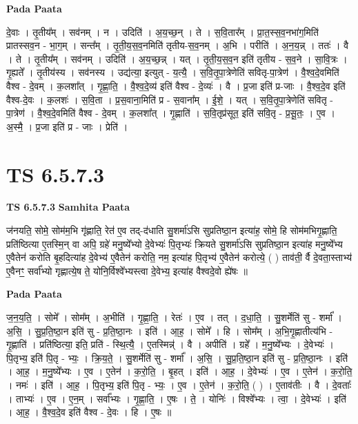 \documentclass[17pt]{extarticle}
\begin{document}
\textbf{Pada Paata} \newline

दे॒वाः । तृ॒तीय᳚म् । सव॑नम् । न । उदिति॑ । अ॒य॒च्छ॒न् । ते । स॒वि॒तार᳚म् । प्रा॒त॒स्स॒व॒नभा॑ग॒मिति॑ प्रातस्सव॒न - भा॒ग॒म् । सन्त᳚म् । तृ॒ती॒य॒स॒व॒नमिति॑ तृतीय-स॒व॒नम् । अ॒भि । परीति॑ । अ॒न॒य॒न्न् । ततः॑ । वै । ते । तृ॒तीय᳚म् । सव॑नम् । उदिति॑ । अ॒य॒च्छ॒न्न् । यत् । तृ॒ती॒य॒स॒व॒न इति॑ तृतीय - स॒व॒ने । सा॒वि॒त्रः । गृ॒ह्यते᳚ । तृ॒तीय॑स्य । सव॑नस्य । उद्य॑त्या॒ इत्युत् - य॒त्यै॒ । स॒वि॒तृ॒पा॒त्रेणेति॑ सवितृ-पा॒त्रेण॑ । वै॒श्व॒दे॒वमिति॑ वैश्व - दे॒वम् । क॒लशा᳚त् । गृ॒ह्णा॒ति॒ । वै॒श्व॒दे॒व्य॑ इति॑ वैश्व - दे॒व्यः॑ । वै । प्र॒जा इति॑ प्र-जाः । वै॒श्व॒दे॒व इति॑ वैश्व-दे॒वः । क॒लशः॑ । स॒वि॒ता । प्र॒स॒वाना॒मिति॑ प्र - स॒वाना᳚म् । ई॒शे॒ । यत् । स॒वि॒तृ॒पा॒त्रेणेति॑ सवितृ - पा॒त्रेण॑ । वै॒श्व॒दे॒वमिति॑ वैश्व - दे॒वम् । क॒लशा᳚त् । गृ॒ह्णाति॑ । स॒वि॒तृप्र॑सूत॒ इति॑ सवि॒तृ - प्र॒सू॒तः॒ । ए॒व । अ॒स्मै॒ । प्र॒जा इति॑ प्र - जाः । प्रेति॑ ।  \newline





\section{ TS 6.5.7.3 }

\textbf{TS 6.5.7.3 } \newline
\textbf{Samhita Paata} \newline

ज॑नयति॒ सोमे॒ सोम॑म॒भि गृ॑ह्णाति॒ रेत॑ ए॒व तद्-द॑धाति सु॒शर्मा॑ऽसि सुप्रतिष्ठा॒न इत्या॑ह॒ सोमे॒ हि सोम॑मभिगृ॒ह्णाति॒ प्रति॑ष्ठित्या ए॒तस्मि॒न् वा अपि॒ ग्रहे॑ मनु॒ष्ये᳚भ्यो दे॒वेभ्यः॑ पि॒तृभ्यः॑ क्रियते सु॒शर्मा॑ऽसि सुप्रतिष्ठा॒न इत्या॑ह मनु॒ष्ये᳚भ्य ए॒वैतेन॑ करोति बृ॒हदित्या॑ह दे॒वेभ्य॑ ए॒वैतेन॑ करोति॒ नम॒ इत्या॑ह पि॒तृभ्य॑ ए॒वैतेन॑ करोत्ये॒ ( ) ताव॑ती॒ र्वै दे॒वता॒स्ताभ्य॑ ए॒वैनꣳ॒॒ सर्वा᳚भ्यो गृह्णात्ये॒ष ते॒ योनि॒र्विश्वे᳚भ्यस्त्वा दे॒वेभ्य॒ इत्या॑ह वैश्वदे॒वो ह्ये॑षः ॥ \newline

\textbf{Pada Paata} \newline

ज॒न॒य॒ति॒ । सोमे᳚ । सोम᳚म् । अ॒भीति॑ । गृ॒ह्णा॒ति॒ । रेतः॑ । ए॒व । तत् । द॒धा॒ति॒ । सु॒शर्मेति॑ सु - शर्मा᳚ । अ॒सि॒ । सु॒प्र॒ति॒ष्ठा॒न इति॑ सु - प्र॒ति॒ष्ठा॒नः । इति॑ । आ॒ह॒ । सोमे᳚ । हि । सोम᳚म् । अ॒भि॒गृ॒ह्णातीत्य॑भि - गृ॒ह्णाति॑ । प्रति॑ष्ठित्या॒ इति॒ प्रति॑ - स्थि॒त्यै॒ । ए॒तस्मिन्न्॑ । वै । अपीति॑ । ग्रहे᳚ । म॒नु॒ष्ये᳚भ्यः । दे॒वेभ्यः॑ । पि॒तृभ्य॒ इति॑ पि॒तृ - भ्यः॒ । क्रि॒य॒ते॒ । सु॒शर्मेति॑ सु - शर्मा᳚ । अ॒सि॒ । सु॒प्र॒ति॒ष्ठा॒न इति॑ सु - प्र॒ति॒ष्ठा॒नः । इति॑ । आ॒ह॒ । म॒नु॒ष्ये᳚भ्यः । ए॒व । ए॒तेन॑ । क॒रो॒ति॒ । बृ॒हत् । इति॑ । आ॒ह॒ । दे॒वेभ्यः॑ । ए॒व । ए॒तेन॑ । क॒रो॒ति॒ । नमः॑ । इति॑ । आ॒ह॒ । पि॒तृभ्य॒ इति॑ पि॒तृ - भ्यः॒ । ए॒व । ए॒तेन॑ । क॒रो॒ति॒ ( ) । ए॒ताव॑तीः । वै । दे॒वताः᳚ । ताभ्यः॑ । ए॒व । ए॒न॒म् । सर्वा᳚भ्यः । गृ॒ह्णा॒ति॒ । ए॒षः । ते॒ । योनिः॑ । विश्वे᳚भ्यः । त्वा॒ । दे॒वेभ्यः॑ । इति॑ । आ॒ह॒ । वै॒श्व॒दे॒व इति॑ वैश्व - दे॒वः । हि । ए॒षः ॥  \newline
\end{document}
